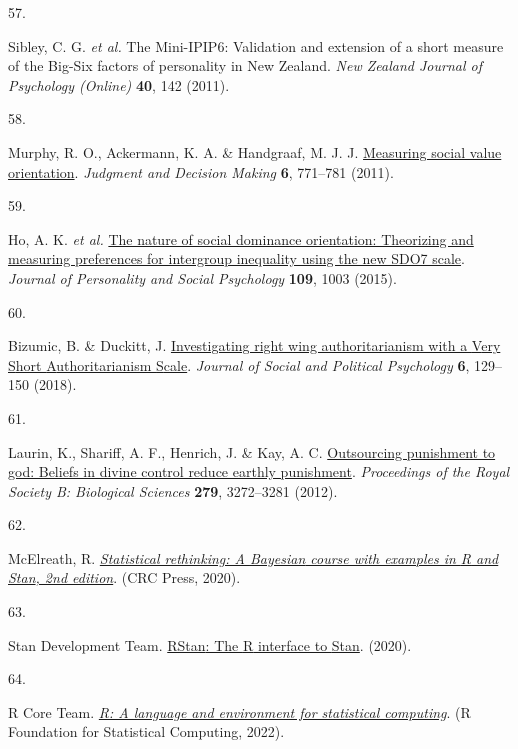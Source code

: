 \documentclass[
  man,floatsintext]{apa6}
\newlength{\cslhangindent}
\newlength{\csllabelwidth}
\newlength{\cslentryspacingunit} %
\newenvironment{CSLReferences}[2] %
 {%
  \setlength{\parindent}{0pt}
  \ifodd #1
  \let\oldpar\par
  \def\par{\hangindent=\cslhangindent\oldpar}
  \fi
  \setlength{\parskip}{#2\cslentryspacingunit}
 }%
 {}
\newcommand{\CSLLeftMargin}[1]{\parbox[t]{\csllabelwidth}{#1}}
\newcommand{\CSLRightInline}[1]{\parbox[t]{\linewidth - \csllabelwidth}{#1}\break}
\begin{document}
\begin{CSLReferences}{0}{0}
\leavevmode{}%
\CSLLeftMargin{57. }%
\CSLRightInline{Sibley, C. G. \emph{et al.} The {M}ini-{IPIP}6: Validation and extension of a short measure of the {B}ig-{S}ix factors of personality in {N}ew {Z}ealand. \emph{New Zealand Journal of Psychology (Online)} \textbf{40}, 142 (2011).}

\leavevmode{}%
\CSLLeftMargin{58. }%
\CSLRightInline{Murphy, R. O., Ackermann, K. A. \& Handgraaf, M. J. J. \href{https://doi.org/10.1017/S1930297500004204}{Measuring social value orientation}. \emph{Judgment and Decision Making} \textbf{6}, 771--781 (2011).}

\leavevmode{}%
\CSLLeftMargin{59. }%
\CSLRightInline{Ho, A. K. \emph{et al.} \href{https://doi.org/10.1037/pspi0000033}{The nature of social dominance orientation: Theorizing and measuring preferences for intergroup inequality using the new SDO7 scale}. \emph{Journal of Personality and Social Psychology} \textbf{109}, 1003 (2015).}

\leavevmode{}%
\CSLLeftMargin{60. }%
\CSLRightInline{Bizumic, B. \& Duckitt, J. \href{https://doi.org/10.5964/jspp.v6i1.835}{Investigating right wing authoritarianism with a {V}ery {S}hort {A}uthoritarianism {S}cale}. \emph{Journal of Social and Political Psychology} \textbf{6}, 129--150 (2018).}

\leavevmode{}%
\CSLLeftMargin{61. }%
\CSLRightInline{Laurin, K., Shariff, A. F., Henrich, J. \& Kay, A. C. \href{https://doi.org/10.1098/rspb.2012.0615}{Outsourcing punishment to god: Beliefs in divine control reduce earthly punishment}. \emph{Proceedings of the Royal Society B: Biological Sciences} \textbf{279}, 3272--3281 (2012).}

\leavevmode{}%
\CSLLeftMargin{62. }%
\CSLRightInline{McElreath, R. \emph{\href{http://xcelab.net/rm/statistical-rethinking/}{Statistical rethinking: A {Bayesian} course with examples in {R} and {Stan}, 2nd edition}}. (CRC Press, 2020).}

\leavevmode{}%
\CSLLeftMargin{63. }%
\CSLRightInline{Stan Development Team. \href{http://mc-stan.org/}{{RStan}: The {R} interface to {Stan}}. (2020).}

\leavevmode{}%
\CSLLeftMargin{64. }%
\CSLRightInline{R Core Team. \emph{\href{https://www.R-project.org/}{R: A language and environment for statistical computing}}. (R Foundation for Statistical Computing, 2022).}


\end{CSLReferences}
\end{document}
